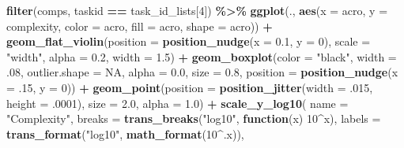 \documentclass[
]{book}
\newenvironment{Shaded}{\begin{snugshade}}{\end{snugshade}}
\newcommand{\AttributeTok}[1]{\textcolor[rgb]{0.13,0.29,0.53}{#1}}
\newcommand{\ConstantTok}[1]{\textcolor[rgb]{0.56,0.35,0.01}{#1}}
\newcommand{\ControlFlowTok}[1]{\textcolor[rgb]{0.13,0.29,0.53}{\textbf{#1}}}
\newcommand{\DecValTok}[1]{\textcolor[rgb]{0.00,0.00,0.81}{#1}}
\newcommand{\FloatTok}[1]{\textcolor[rgb]{0.00,0.00,0.81}{#1}}
\newcommand{\FunctionTok}[1]{\textcolor[rgb]{0.13,0.29,0.53}{\textbf{#1}}}
\newcommand{\NormalTok}[1]{#1}
\newcommand{\SpecialCharTok}[1]{\textcolor[rgb]{0.81,0.36,0.00}{\textbf{#1}}}
\newcommand{\StringTok}[1]{\textcolor[rgb]{0.31,0.60,0.02}{#1}}
\begin{document}
\begin{Shaded}
\begin{Highlighting}[]
\FunctionTok{filter}\NormalTok{(comps, taskid }\SpecialCharTok{==}\NormalTok{ task\_id\_lists[}\DecValTok{4}\NormalTok{]) }\SpecialCharTok{\%\textgreater{}\%}
  \FunctionTok{ggplot}\NormalTok{(., }\FunctionTok{aes}\NormalTok{(}\AttributeTok{x =}\NormalTok{ acro, }\AttributeTok{y =}\NormalTok{ complexity, }\AttributeTok{color =}\NormalTok{ acro,}
                \AttributeTok{fill =}\NormalTok{ acro, }\AttributeTok{shape =}\NormalTok{ acro)) }\SpecialCharTok{+}
  \FunctionTok{geom\_flat\_violin}\NormalTok{(}\AttributeTok{position =} \FunctionTok{position\_nudge}\NormalTok{(}\AttributeTok{x =} \FloatTok{0.1}\NormalTok{, }\AttributeTok{y =} \DecValTok{0}\NormalTok{),}
                   \AttributeTok{scale =} \StringTok{"width"}\NormalTok{, }\AttributeTok{alpha =} \FloatTok{0.2}\NormalTok{, }\AttributeTok{width =} \FloatTok{1.5}\NormalTok{) }\SpecialCharTok{+}
  \FunctionTok{geom\_boxplot}\NormalTok{(}\AttributeTok{color =} \StringTok{"black"}\NormalTok{, }\AttributeTok{width =}\NormalTok{ .}\DecValTok{08}\NormalTok{, }\AttributeTok{outlier.shape =} \ConstantTok{NA}\NormalTok{, }\AttributeTok{alpha =} \FloatTok{0.0}\NormalTok{,}
               \AttributeTok{size =} \FloatTok{0.8}\NormalTok{, }\AttributeTok{position =} \FunctionTok{position\_nudge}\NormalTok{(}\AttributeTok{x =}\NormalTok{ .}\DecValTok{15}\NormalTok{, }\AttributeTok{y =} \DecValTok{0}\NormalTok{)) }\SpecialCharTok{+}
  \FunctionTok{geom\_point}\NormalTok{(}\AttributeTok{position =} \FunctionTok{position\_jitter}\NormalTok{(}\AttributeTok{width =}\NormalTok{ .}\DecValTok{015}\NormalTok{, }\AttributeTok{height =}\NormalTok{ .}\DecValTok{0001}\NormalTok{),}
             \AttributeTok{size =} \FloatTok{2.0}\NormalTok{, }\AttributeTok{alpha =} \FloatTok{1.0}\NormalTok{) }\SpecialCharTok{+}
  \FunctionTok{scale\_y\_log10}\NormalTok{(}
    \AttributeTok{name =} \StringTok{"Complexity"}\NormalTok{,}
    \AttributeTok{breaks =} \FunctionTok{trans\_breaks}\NormalTok{(}\StringTok{"log10"}\NormalTok{, }\ControlFlowTok{function}\NormalTok{(x) }\DecValTok{10}\SpecialCharTok{\^{}}\NormalTok{x),}
    \AttributeTok{labels =} \FunctionTok{trans\_format}\NormalTok{(}\StringTok{"log10"}\NormalTok{, }\FunctionTok{math\_format}\NormalTok{(}\DecValTok{10}\SpecialCharTok{\^{}}\NormalTok{.x)),}


\end{Highlighting}
\end{Shaded}
\end{document}
